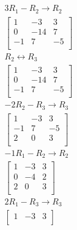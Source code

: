 \documentclass[12pt letter]{report}
\begin{document}
{{\begin{enumerate}
\begin{align*}
              \\
              3R_1 - R_2  \rightarrow R_2                                                                         \\
              \begin{bmatrix}
                1  & -3  & 3  \\
                0  & -14 & 7  \\
                -1 & 7   & -5 \\
              \end{bmatrix}
              \\
              R_2 \leftrightarrow R_3                                                                             \\
              \begin{bmatrix}
                1  & -3  & 3  \\
                0  & -14 & 7  \\
                -1 & 7   & -5 \\
              \end{bmatrix}
              \\
              -2R_2 - R_3  \rightarrow R_3                                                                        \\
              \begin{bmatrix}
                1  & -3 & 3  \\
                -1 & 7  & -5 \\
                2  & 0  & 3  \\
              \end{bmatrix}
              \\
              -1R_1 - R_2  \rightarrow R_2                                                                        \\
              \begin{bmatrix}
                1 & -3 & 3 \\
                0 & -4 & 2 \\
                2 & 0  & 3 \\
              \end{bmatrix}
              \\
              2R_1 - R_3  \rightarrow R_3                                                                         \\
              \begin{bmatrix}
                1 & -3 & 3 \\

\end{bmatrix}
\end{align*}
\end{enumerate}}}
\end{document}
